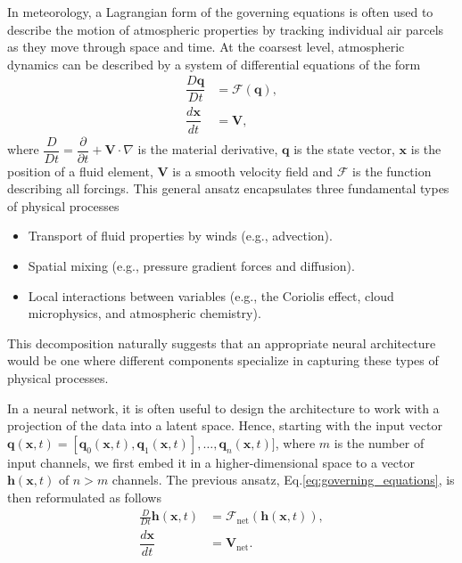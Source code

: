 \documentclass[preprint]{article}
\begin{document}
In meteorology, a Lagrangian form of the governing equations is often used to describe the motion of atmospheric properties by tracking individual air parcels as they move through space and time. At the coarsest level, atmospheric dynamics can be described by a system of differential equations of the form 
\begin{align}\label{eq:governing_equations}
\dfrac{D\mathbf{q}}{Dt} &= \mathcal{F}(\mathbf{q}),\\
\dfrac{d\mathbf{x}}{dt} &= \mathbf{V},
\end{align}
where $\dfrac{D}{Dt} = \dfrac{\partial}{\partial t} + \mathbf{V} \cdot \nabla$ is the material derivative, $\mathbf{q}$ is the state vector, $\mathbf{x}$ is the position of a fluid element, $\mathbf{V}$ is a smooth velocity field and $\mathcal{F}$ is the function describing all forcings. This general ansatz encapsulates three fundamental types of physical processes 
\begin{itemize}
    \item Transport of fluid properties by winds (e.g., advection).
    \item Spatial mixing (e.g., pressure gradient forces and diffusion).
    \item Local interactions between variables (e.g., the Coriolis effect, cloud microphysics, and atmospheric chemistry).
\end{itemize}
This decomposition naturally suggests that an appropriate neural architecture would be one where different components specialize in capturing these types of physical processes. 

In a neural network, it is often useful to design the architecture to work with a projection of the data into a latent space. Hence, starting with the input vector $\mathbf{q} (\mathbf{x},t)=[\mathbf{q}_0(\mathbf{x},t),\mathbf{q}_1(\mathbf{x},t)],\ldots,\mathbf{q}_n(\mathbf{x},t)]$, where $m$ is the number of input channels, we first embed it in a higher-dimensional space to a vector $\mathbf{h}(\mathbf{x},t)$ of $n>m$ channels. The previous ansatz, Eq.\eqref{eq:governing_equations}, is then reformulated as follows
\begin{align}\label{eq:ansatz}
\frac{D}{Dt}\mathbf{h}(\mathbf{x},t) &= \mathcal{F}_\text{net}(\mathbf{h}(\mathbf x, t)),\\
\nonumber \dfrac{d\mathbf{x}}{dt} &= \mathbf{V}_\text{net}.
\end{align}
\end{document}
